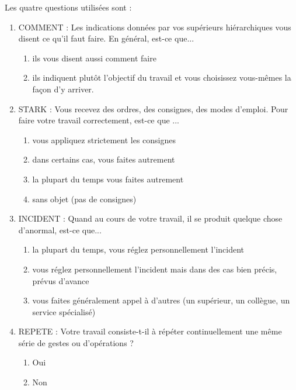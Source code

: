 \documentclass[11pt,fleqn,openany,frenchb]{book} %
\begin{document}
Les quatre questions utilisées sont : 
\begin{enumerate}
\item COMMENT : Les indications données par vos supérieurs hiérarchiques vous disent ce qu'il faut faire. En général, est-ce que...
    \begin{enumerate}
    \item ils vous disent aussi comment faire
    \item ils indiquent plutôt l'objectif du travail et vous choisissez vous-mêmes la façon d'y arriver.
    \end{enumerate}
\item STARK : Vous recevez des ordres, des consignes, des modes d'emploi. Pour faire votre travail correctement, est-ce que ...
    \begin{enumerate}
    \item  vous appliquez strictement les consignes
    \item dans certains cas, vous faites autrement
    \item la plupart du temps vous faites autrement
    \item sans objet (pas de consignes)
    \end{enumerate}
\item INCIDENT : Quand au cours de votre travail, il se produit quelque chose d'anormal, est-ce que...
    \begin{enumerate}
    \item la plupart du temps, vous réglez personnellement l'incident
    \item vous réglez personnellement l’incident mais dans des cas bien précis, prévus
    d’avance
    \item vous faites généralement appel à d'autres (un supérieur, un collègue, un service
    spécialisé)
    \end{enumerate}
\item REPETE : Votre travail consiste-t-il à répéter continuellement une même série de gestes ou d'opérations ?
    \begin{enumerate}
    \item Oui
    \item Non
    \end{enumerate}
\end{enumerate}
\end{document}
